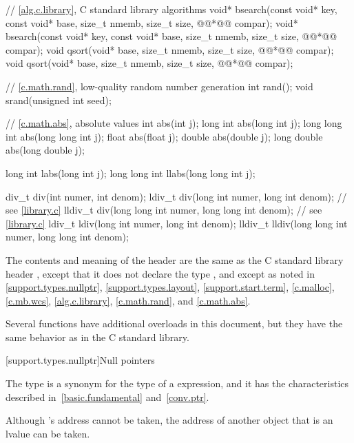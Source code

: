 \begin{codeblock}
{  // \ref{alg.c.library}, C standard library algorithms
  void* bsearch(const void* key, const void* base, size_t nmemb, size_t size,
                @@*@\itcorr[-1]@ compar);
  void* bsearch(const void* key, const void* base, size_t nmemb, size_t size,
                @@*@\itcorr[-1]@ compar);
  void qsort(void* base, size_t nmemb, size_t size, @@*@\itcorr[-1]@ compar);
  void qsort(void* base, size_t nmemb, size_t size, @@*@\itcorr[-1]@ compar);

  // \ref{c.math.rand}, low-quality random number generation
  int rand();
  void srand(unsigned int seed);

  // \ref{c.math.abs}, absolute values
  int abs(int j);
  long int abs(long int j);
  long long int abs(long long int j);
  float abs(float j);
  double abs(double j);
  long double abs(long double j);

  long int labs(long int j);
  long long int llabs(long long int j);

  div_t div(int numer, int denom);
  ldiv_t div(long int numer, long int denom);             // see \ref{library.c}
  lldiv_t div(long long int numer, long long int denom);  // see \ref{library.c}
  ldiv_t ldiv(long int numer, long int denom);
  lldiv_t lldiv(long long int numer, long long int denom);
}
\end{codeblock}

\pnum
The contents and meaning of the header  are the same as
the C standard library header ,
except that it does not declare the type ,
and except as noted in
\ref{support.types.nullptr},
\ref{support.types.layout},
\ref{support.start.term},
\ref{c.malloc},
\ref{c.mb.wcs},
\ref{alg.c.library},
\ref{c.math.rand}, and
\ref{c.math.abs}.
\begin{note}
Several functions have additional overloads in this document,
but they have the same behavior as in the C standard library.
\end{note}


[support.types.nullptr]{Null pointers}

\pnum
{}%
The type  is a synonym
for the type of a  expression, and it
has the characteristics
described in~\ref{basic.fundamental} and~\ref{conv.ptr}.
\begin{note}
Although 's address cannot be taken, the address of another
 object that is an lvalue can be taken.
\end{note}

